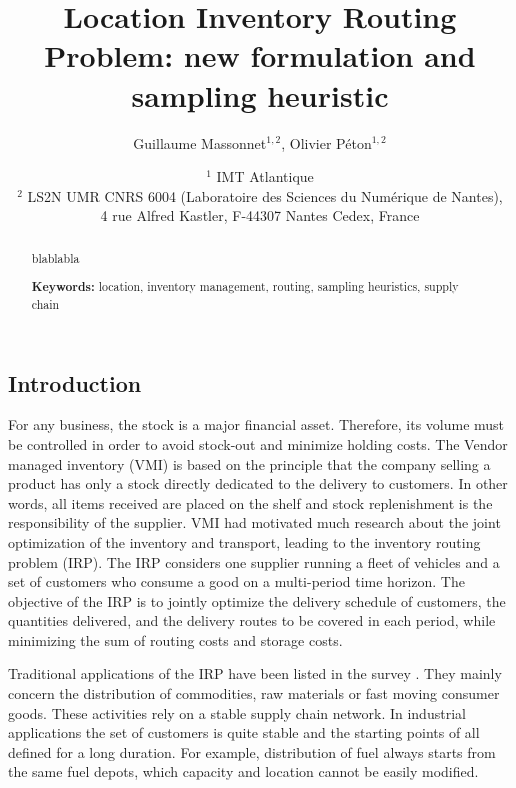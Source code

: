 \documentclass[a4paper,10pt]{article}
\title{Location Inventory Routing Problem: new formulation and sampling heuristic}
\author{Guillaume Massonnet$^{1,2}$, Olivier P\'eton$^{1,2}$}
\date{$^1$ IMT Atlantique\\ 
	$^2$ LS2N UMR CNRS 6004 (Laboratoire des Sciences du Numérique de Nantes), \\ 4 rue Alfred Kastler, F-44307 Nantes Cedex, France}
\begin{document}
	
\maketitle

\begin{abstract}
	blablabla
	
	
\textbf{Keywords:}		location, inventory management, routing, sampling heuristics, supply chain
	
\end{abstract}



\modulolinenumbers[5]
\linenumbers
\begin{linenumbers}


\section{Introduction}

For any business, the stock is a major financial asset. 
Therefore, its volume must be controlled in order to avoid stock-out and minimize holding costs. 
The Vendor managed inventory (VMI) is based on the principle that the company selling a product has only a stock directly dedicated to the delivery to customers. In other words, all items received are placed on the shelf and stock replenishment is the responsibility of the supplier. VMI had motivated much research about the joint optimization of the inventory and transport, leading to the inventory routing problem (IRP). The IRP considers one supplier running a fleet of vehicles and a set of customers who consume a good on a multi-period time horizon. The objective of the IRP is to jointly optimize the delivery schedule of customers, the quantities delivered, and the delivery routes to be covered in each period, while minimizing the sum of routing costs and storage costs.

Traditional applications of the IRP have been listed in the survey \cite{Coelho2014}. They mainly concern the distribution of commodities, raw materials or fast moving consumer goods. These activities rely on a stable supply chain network. 
In industrial applications the set of customers is quite stable and the starting points of all defined for a long duration.
For example, distribution of fuel always starts from the same fuel depots, which capacity and location cannot be easily modified. 


\end{linenumbers}
\end{document}
